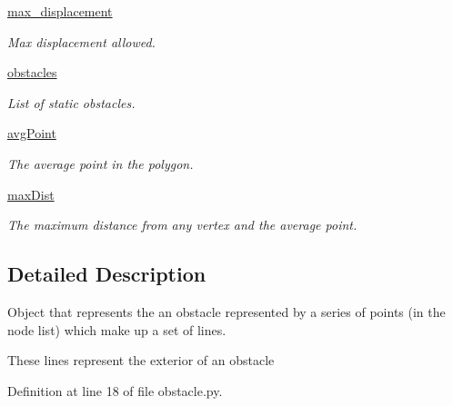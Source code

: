 \begin{DoxyCompactItemize}
\hyperlink{classobstacle_1_1PolyObstacle_a01bca757590d23eeee5c864472a7fbe6}{max\-\_\-displacement}
\begin{DoxyCompactList}\small\item\em Max displacement allowed. \end{DoxyCompactList}\item 
\hyperlink{classobstacle_1_1PolyObstacle_a7df678f9d9362489ba24e0dd9ed70efc}{obstacles}
\begin{DoxyCompactList}\small\item\em List of static obstacles. \end{DoxyCompactList}\item 
\hyperlink{classobstacle_1_1PolyObstacle_ae426e9296754e1ba96abcee3b86b3591}{avg\-Point}
\begin{DoxyCompactList}\small\item\em The average point in the polygon. \end{DoxyCompactList}\item 
\hyperlink{classobstacle_1_1PolyObstacle_a14e97b3f09f9ff21f36efc7a58759e5c}{max\-Dist}
\begin{DoxyCompactList}\small\item\em The maximum distance from any vertex and the average point. \end{DoxyCompactList}\end{DoxyCompactItemize}


\subsection{Detailed Description}
Object that represents the an obstacle represented by a series of points (in the node list) which make up a set of lines. 

These lines represent the exterior of an obstacle 

Definition at line 18 of file obstacle.\-py.



